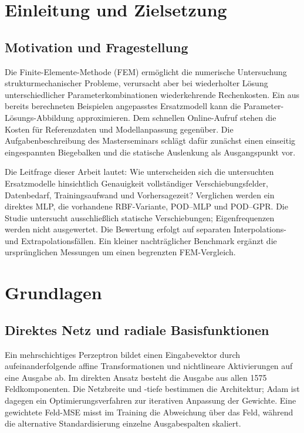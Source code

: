 \chapter{Einleitung und Zielsetzung}
\section{Motivation und Fragestellung}
Die Finite-Elemente-Methode (FEM) ermöglicht die numerische Untersuchung strukturmechanischer Probleme, verursacht aber bei wiederholter Lösung unterschiedlicher Parameterkombinationen wiederkehrende Rechenkosten. Ein aus bereits berechneten Beispielen angepasstes Ersatzmodell kann die Parameter-Lösungs-Abbildung approximieren. Dem schnellen Online-Aufruf stehen die Kosten für Referenzdaten und Modellanpassung gegenüber. Die Aufgabenbeschreibung des Masterseminars schlägt dafür zunächst einen einseitig eingespannten Biegebalken und die statische Auslenkung als Ausgangspunkt vor\cite{aufgabe}.

Die Leitfrage dieser Arbeit lautet: Wie unterscheiden sich die untersuchten Ersatzmodelle hinsichtlich Genauigkeit vollständiger Verschiebungsfelder, Datenbedarf, Trainingsaufwand und Vorhersagezeit? Verglichen werden ein direktes MLP, die vorhandene RBF-Variante, POD--MLP und POD--GPR. Die Studie untersucht ausschließlich statische Verschiebungen; Eigenfrequenzen werden nicht ausgewertet. Die Bewertung erfolgt auf separaten Interpolations- und Extrapolationsfällen. Ein kleiner nachträglicher Benchmark ergänzt die ursprünglichen Messungen um einen begrenzten FEM-Vergleich.

\chapter{Grundlagen}
\section{Direktes Netz und radiale Basisfunktionen}
Ein mehrschichtiges Perzeptron bildet einen Eingabevektor durch aufeinanderfolgende affine Transformationen und nichtlineare Aktivierungen auf eine Ausgabe ab. Im direkten Ansatz besteht die Ausgabe aus allen 1575 Feldkomponenten. Die Netzbreite und -tiefe bestimmen die Architektur; Adam ist dagegen ein Optimierungsverfahren zur iterativen Anpassung der Gewichte\cite{kingma2015}. Eine gewichtete Feld-MSE misst im Training die Abweichung über das Feld, während die alternative Standardisierung einzelne Ausgabespalten skaliert.

